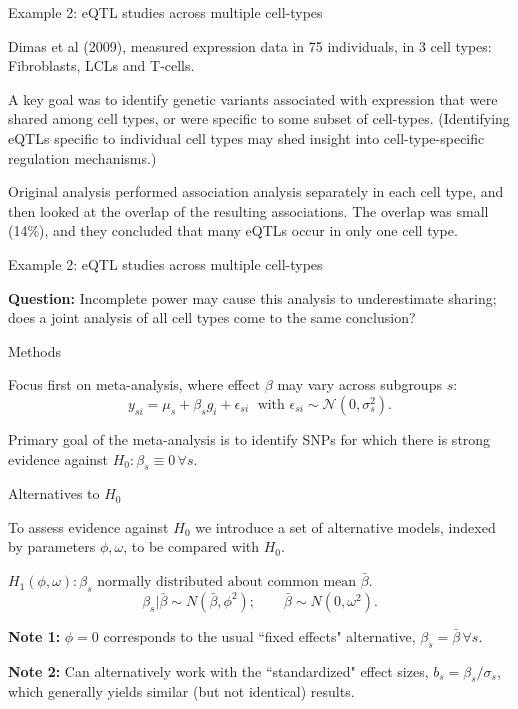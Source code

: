 \documentclass[ignorenonframetext]{beamer}
\begin{document}
 
 \begin{frame}{Example 2: eQTL studies across multiple cell-types}
 
 Dimas et al (2009), measured expression data in 75 individuals, in 3 cell types: Fibroblasts, LCLs and T-cells.
 
 \bigskip
 
A key goal was to identify genetic variants associated with expression that were shared among
 cell types, or were specific to some subset of cell-types.  (Identifying eQTLs specific to individual cell types may shed insight into
 cell-type-specific regulation mechanisms.)
 
 \bigskip
 
 Original analysis performed association analysis separately in each cell type, and then looked at the overlap
 of the resulting associations.  The overlap was small (14\%), and they concluded that many eQTLs occur in only one cell type. 
 
 \end{frame}
 
 \begin{frame}{Example 2: eQTL studies across multiple cell-types}
 
 {\bf Question:} Incomplete power may cause this analysis to underestimate sharing; does a joint analysis of all cell types
 come to the same conclusion?
\end{frame}

\begin{frame}{Methods}

Focus first on meta-analysis, where effect $\beta$ may vary across subgroups $s$:
$$y_{si} = \mu_s + \beta_s g_i + \epsilon_{si} \; \text{ with }\epsilon_{si} \sim \mathcal{N}(0,\sigma_s^2).$$

\bigskip

Primary goal of the meta-analysis is to identify SNPs for which there is strong evidence
against $H_0: \beta_s \equiv 0 \, \forall s$. 
\end{frame}

\begin{frame}{Alternatives to $H_0$}

To assess evidence against $H_0$ we introduce a set of alternative models, indexed
by parameters $\phi, \omega$, to be compared with $H_0$.

\bigskip

$H_1(\phi, \omega): \beta_s \text{ normally distributed about common mean } \bar \beta$.
$$\beta_s |\bar \beta \sim N(\bar\beta,\phi^2); \qquad \bar\beta \sim N(0, \omega^2).$$

\bigskip

{\bf Note 1:} $\phi=0$ corresponds to the usual ``fixed effects" alternative, $\beta_s = \bar \beta \, \forall s$.

\bigskip
{\bf Note 2:} Can alternatively work with the ``standardized" effect sizes, $b_s = \beta_s/\sigma_s$, which 
generally yields similar (but not identical) results.
\end{frame}
\end{document}
